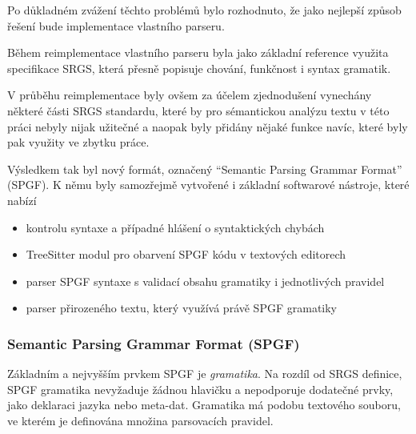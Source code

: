 Po důkladném zvážení těchto problémů bylo rozhodnuto,
že jako nejlepší způsob řešení bude implementace vlastního parseru.

Během reimplementace vlastního parseru byla jako základní reference využita specifikace SRGS,
která přesně popisuje chování, funkčnost i syntax gramatik.

V průběhu reimplementace byly ovšem za účelem zjednodušení vynechány některé části SRGS standardu,
které by pro sémantickou analýzu textu v této práci nebyly nijak užitečné a naopak byly přidány nějaké funkce navíc,
které byly pak využity ve zbytku práce.

Výsledkem tak byl nový formát, označený \enquote{Semantic Parsing Grammar Format} (SPGF).
K němu byly samozřejmě vytvořené i základní softwarové nástroje, které nabízí
\begin{itemize}
	\item kontrolu syntaxe a případné hlášení o syntaktických chybách
	\item TreeSitter modul pro obarvení SPGF kódu v textových editorech
	\item parser SPGF syntaxe s validací obsahu gramatiky i jednotlivých pravidel
	\item parser přirozeného textu, který využívá právě SPGF gramatiky
\end{itemize}

\subsubsection{Semantic Parsing Grammar Format (SPGF)}\label{subsubsec:spgf_def}
Základním a nejvyšším prvkem SPGF je \emph{gramatika}.
Na rozdíl od SRGS definice, SPGF gramatika nevyžaduje žádnou hlavičku a nepodporuje dodatečné prvky,
jako deklaraci jazyka nebo meta-dat.
Gramatika má podobu textového souboru, ve kterém je definována množina parsovacích pravidel.

